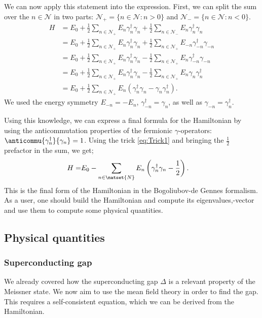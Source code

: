 \documentclass[../main.tex]{subfile}
\begin{document}
We can now apply this statement into the expression. First, we can split the sum over the $n\in\mathcal{N}$ in two parts: $\mathcal{N}_+ = \{n \in \mathcal{N} : n> 0 \}$ and
 $\mathcal{N}_- = \{n \in \mathcal{N} : n<0 \}$.
\begin{align*}
    H &= E_0 + \frac{1}{2}\sum_{n\in\mathcal{N}_+} E_n \gamma^{\dagger}_n\gamma_n + \frac{1}{2}\sum_{n\in\mathcal{N}_-} E_n \gamma^{\dagger}_n\gamma_n\\
      &= E_0 + \frac{1}{2}\sum_{n\in\mathcal{N}_+} E_n \gamma^{\dagger}_n\gamma_n + \frac{1}{2}\sum_{n\in\mathcal{N}_+} E_{-n} \gamma^{\dagger}_{-n}\gamma_{-n}\\
      &= E_0 + \frac{1}{2}\sum_{n\in\mathcal{N}_+} E_n \gamma^{\dagger}_n\gamma_n - \frac{1}{2}\sum_{n\in\mathcal{N}_+} E_n \gamma^{\dagger}_{-n}\gamma_{-n}\\
      &= E_0 + \frac{1}{2}\sum_{n\in\mathcal{N}_+} E_n \gamma^{\dagger}_n\gamma_n - \frac{1}{2}\sum_{n\in\mathcal{N}_+} E_n \gamma_{n}\gamma^{\dagger}_{n}\\
      &= E_0 + \frac{1}{2}\sum_{n\in\mathcal{N}_+} E_n \left( \gamma^{\dagger}_n\gamma_n -\gamma_{n}\gamma^{\dagger}_{n}\right).
\end{align*}
We used the energy symmetry $E_{-n} = -E_n$, $\gamma^{\dagger}_{-n} =\gamma_{n}$, as well as $\gamma_{-n} =\gamma^{\dagger}_{n}$.

Using this knowledge, we can express a final formula for the Hamiltonian by using the anticommutation properties of the fermionic $\gamma$-operators:
 $\anticommu{\gamma^{\dagger}_n}{\gamma_{n}} = 1$. Using the trick \ref{eq:Trick1} and bringing the $\frac{1}{2}$ prefactor in the sum, we get;
\begin{align}
    H =& E_0 - \sum_{n\in \natset{N}} E_n \left( \gamma_n^{\dagger}\gamma_n - \frac{1}{2}\right).
\end{align}
This is the final form of the Hamiltonian in the Bogoliubov-de Gennes formalism. As a user, one should build the Hamiltonian 
and compute its eigenvalues,-vector and use them to compute some physical quantities.\\
\subsection{Physical quantities}
\subsubsection{Superconducting gap}
We already covered how the superconducting gap $\Delta$ is a relevant property of the Meissner state. We now aim to use the  mean field 
theory in order to find the gap. This requires a self-consistent equation, which we can be derived from the Hamiltonian.\\ 
\end{document}
